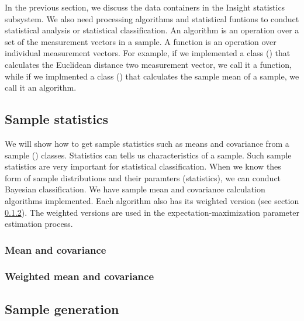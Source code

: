 In the previous section, we discuss the data containers in the Insight
statistics subsystem. We also need processing algorithms and
statistical funtions to conduct statistical analysis or statistical
classification. An algorithm is an operation over a set of the
measurement vectors in a sample. A function is an operation over
individual measurement vectors. For example, if we implemented a class
() that calculates the
Euclidean distance two measurement vector, we call it a function,
while if we implmented a class
() that calculates the sample
mean of a sample, we call it an algorithm.

\subsection{Sample statistics}
\label{sec:SampleStatistics}

 We will show how to get sample statistics such as means and covariance
 from a sample () classes. Statistics can
 tells us characteristics of a sample. Such sample statistics are very
 important for statistical classification. When we know thes form of
 sample distributions and their paramters (statistics), we can conduct
 Bayesian classification. We have sample mean and covariance calculation
 algorithms implemented. Each algorithm also has its weighted version
 (see section \ref{sec:WeightedMeanCovariance}). The weighted
 versions are used in the expectation-maximization parameter estimation
 process.

\subsubsection{Mean and covariance}
\label{sec:MeanCovariance}



\subsubsection{Weighted mean and covariance}
\label{sec:WeightedMeanCovariance}



\subsection{Sample generation}
\label{sec:SampleGeneration}

